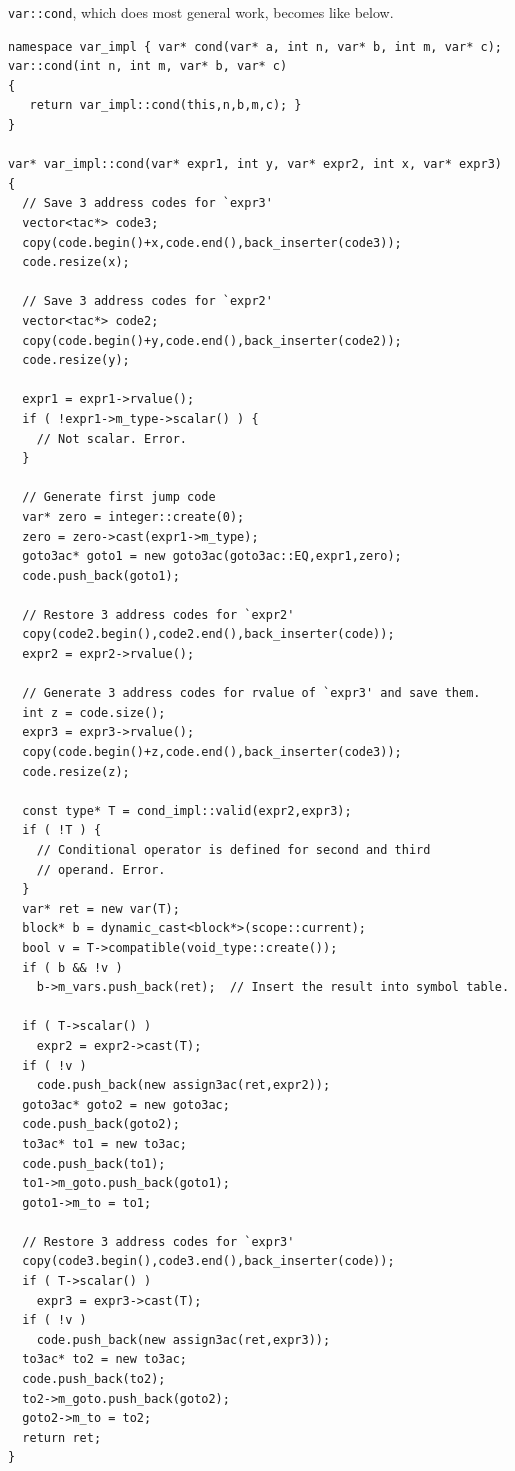 {\tt{var::cond}}, which does most general work, becomes like below.
\begin{verbatim}
namespace var_impl { var* cond(var* a, int n, var* b, int m, var* c);
var::cond(int n, int m, var* b, var* c)
{
   return var_impl::cond(this,n,b,m,c); }
}

var* var_impl::cond(var* expr1, int y, var* expr2, int x, var* expr3)
{
  // Save 3 address codes for `expr3'
  vector<tac*> code3;
  copy(code.begin()+x,code.end(),back_inserter(code3));
  code.resize(x);

  // Save 3 address codes for `expr2'
  vector<tac*> code2;
  copy(code.begin()+y,code.end(),back_inserter(code2));
  code.resize(y);

  expr1 = expr1->rvalue();
  if ( !expr1->m_type->scalar() ) {
    // Not scalar. Error.
  }

  // Generate first jump code
  var* zero = integer::create(0);
  zero = zero->cast(expr1->m_type);
  goto3ac* goto1 = new goto3ac(goto3ac::EQ,expr1,zero);
  code.push_back(goto1);

  // Restore 3 address codes for `expr2'
  copy(code2.begin(),code2.end(),back_inserter(code));
  expr2 = expr2->rvalue();

  // Generate 3 address codes for rvalue of `expr3' and save them.
  int z = code.size();
  expr3 = expr3->rvalue();
  copy(code.begin()+z,code.end(),back_inserter(code3));
  code.resize(z);

  const type* T = cond_impl::valid(expr2,expr3);
  if ( !T ) {
    // Conditional operator is defined for second and third
    // operand. Error.
  }
  var* ret = new var(T);
  block* b = dynamic_cast<block*>(scope::current);
  bool v = T->compatible(void_type::create());
  if ( b && !v )
    b->m_vars.push_back(ret);  // Insert the result into symbol table.

  if ( T->scalar() )
    expr2 = expr2->cast(T);
  if ( !v )
    code.push_back(new assign3ac(ret,expr2));
  goto3ac* goto2 = new goto3ac;
  code.push_back(goto2);
  to3ac* to1 = new to3ac;
  code.push_back(to1);
  to1->m_goto.push_back(goto1);
  goto1->m_to = to1;

  // Restore 3 address codes for `expr3'
  copy(code3.begin(),code3.end(),back_inserter(code));
  if ( T->scalar() )
    expr3 = expr3->cast(T);
  if ( !v )
    code.push_back(new assign3ac(ret,expr3));
  to3ac* to2 = new to3ac;
  code.push_back(to2);
  to2->m_goto.push_back(goto2);
  goto2->m_to = to2;
  return ret;
}
\end{verbatim}

